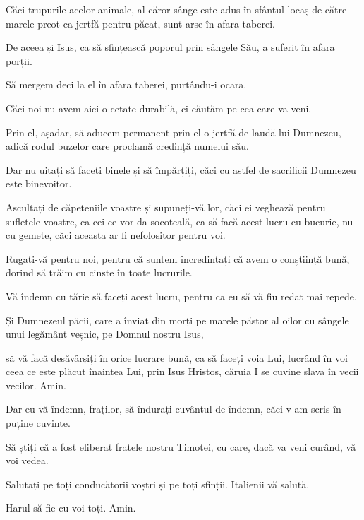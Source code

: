 {Căci trupurile acelor animale, al căror sânge este adus în sfântul locaș de către marele preot ca jertfă pentru păcat, sunt arse în afara taberei.

De aceea și Isus, ca să sfințească poporul prin sângele Său, a suferit în afara porții.

Să mergem deci la el în afara taberei, purtându-i ocara.

Căci noi nu avem aici o cetate durabilă, ci căutăm pe cea care va veni.

Prin el, așadar, să aducem permanent prin el o jertfă de laudă lui Dumnezeu, adică rodul buzelor care proclamă credință numelui său.

Dar nu uitați să faceți binele și să împărțiți, căci cu astfel de sacrificii Dumnezeu este binevoitor.


\par }{\PP {}Ascultați de căpeteniile voastre și supuneți-vă lor, căci ei veghează pentru sufletele voastre, ca cei ce vor da socoteală, ca să facă acest lucru cu bucurie, nu cu gemete, căci aceasta ar fi nefolositor pentru voi.


\par }{\PP {}Rugați-vă pentru noi, pentru că suntem încredințați că avem o conștiință bună, dorind să trăim cu cinste în toate lucrurile.

Vă îndemn cu tărie să faceți acest lucru, pentru ca eu să vă fiu redat mai repede.


\par }{\PP {}Și Dumnezeul păcii, care a înviat din morți pe marele păstor al oilor cu sângele unui legământ veșnic, pe Domnul nostru Isus,

să vă facă desăvârșiți în orice lucrare bună, ca să faceți voia Lui, lucrând în voi ceea ce este plăcut înaintea Lui, prin Isus Hristos, căruia I se cuvine slava în vecii vecilor. Amin.


\par }{\PP {}Dar eu vă îndemn, fraților, să îndurați cuvântul de îndemn, căci v-am scris în puține cuvinte.

Să știți că a fost eliberat fratele nostru Timotei, cu care, dacă va veni curând, vă voi vedea.


\par }{\PP {}Salutați pe toți conducătorii voștri și pe toți sfinții. Italienii vă salută.


\par }{\PP {}Harul să fie cu voi toți. Amin.


\par }